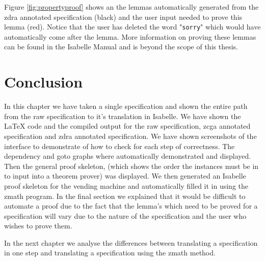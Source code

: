 Figure \ref{fig:propertyproof} shows an the lemmas automatically generated from the \gls{zdra} annotated specification (black) and the user input needed to prove this lemma (red). Notice that the user has deleted the word "\texttt{sorry}" which would have automatically come after the lemma. More information on proving these lemmas can be found in the Isabelle Manual \cite{isabelle} and is beyond the scope of this thesis.

\section{Conclusion}
In this chapter we have taken a single specification and shown the entire path from the raw specification to it's translation in Isabelle. We have shown the \LaTeX{} code and the compiled output for the raw specification, \gls{zcga} annotated specification and \gls{zdra} annotated specification. We have shown screenshots of the interface to demonstrate of how to check for each step of correctness. The dependency and goto graphs where automatically demonstrated and displayed. Then the general proof skeleton, (which shows the order the instances must be in to input into a theorem prover) was displayed. We then generated an Isabelle proof skeleton for the vending machine and automatically filled it in using the \gls{zmath} program. In the final section we explained that it would be difficult to automate a proof due to the fact that the lemma's which need to be proved for a specification will vary due to the nature of the specification and the user who wishes to prove them. 

In the next chapter we analyse the differences between translating a specification in one step and translating a specification using the \gls{zmath} method.